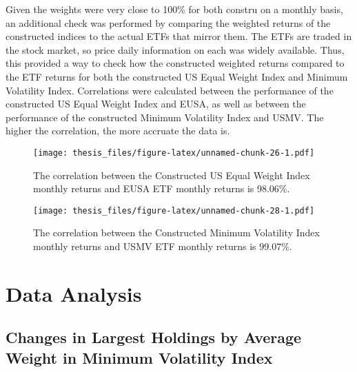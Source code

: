 \documentclass[12pt,twoside]{reedthesis}
\theoremstyle{definition}
\theoremstyle{definition}
\theoremstyle{definition}
\theoremstyle{remark}
\begin{document}
Given the weights were very close to 100\% for both constru on a monthly
basis, an additional check was performed by comparing the weighted
returns of the constructed indices to the actual ETFs that mirror them.
The ETFs are traded in the stock market, so price daily information on
each was widely available. Thus, this provided a way to check how the
constructed weighted returns compared to the ETF returns for both the
constructed US Equal Weight Index and Minimum Volatility Index.
Correlations were calculated between the performance of the constructed
US Equal Weight Index and EUSA, as well as between the performance of
the constructed Minimum Volatility Index and USMV. The higher the
correlation, the more accruate the data is.
\begin{figure}[htbp]
\centering
\texttt{[image: thesis\_files/figure-latex/unnamed-chunk-26-1.pdf]}
\caption{\label{fig:unnamed-chunk-26}The correlation between the Constructed
US Equal Weight Index monthly returns and EUSA ETF monthly returns is
98.06\%.}
\end{figure}
\begin{figure}[htbp]
\centering
\texttt{[image: thesis\_files/figure-latex/unnamed-chunk-28-1.pdf]}
\caption{\label{fig:unnamed-chunk-28}The correlation between the Constructed
Minimum Volatility Index monthly returns and USMV ETF monthly returns is
99.07\%.}
\end{figure}
\chapter{Data Analysis}\label{data-analysis}

\section{Changes in Largest Holdings by Average Weight in Minimum
Volatility
Index}\label{changes-in-largest-holdings-by-average-weight-in-minimum-volatility-index}
\end{document}
